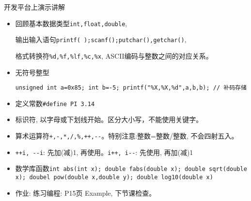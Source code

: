 
\begin{frame}{开发平台上演示讲解}
\vspace{-0.5cm}
\begin{itemize}
	\item 回顾基本数据类型\lstinline|int,float,double|,
	
	 输出输入语句\lstinline|printf( );scanf();putchar(),getchar()|,
	 
	 格式转换符\lstinline|%d,%f,%lf,%c,%x|, ASCII编码与整数之间的对应关系。
	\item 无符号整型
	
	\lstinline|unsigned int a=0x85; int b=-5; printf("%X,%X,%d",a,b,b); // 补码存储| 
	\item 定义常数\lstinline|#define PI 3.14|
	\item 标识符, 以字母或下划线开始。区分大小写，不能使用关键字。
	\item 算术运算符\lstinline|+,-,*,/,%,++,--|。特别注意:整数=整数/整数, 不会四射五入。
	\item \lstinline|++i, --i|: 先加(减)1, 再使用。\lstinline|i++, i--|: 先使用, 再加(减)1
	\item 数学库函数\lstinline|int abs(int x); double fabs(double x); double sqrt(double x); doubel pow(double x,double y); double log10(double x)|
	\item 作业: 练习编程: P15页 Example, 下节课检查。
\end{itemize}
\end{frame}




